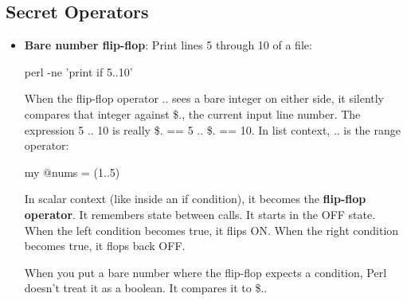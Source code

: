 \documentclass{report}
\begin{document}
    \subsection{Secret Operators}
    \begin{itemize}
        \item \textbf{Bare number flip-flop}: Print lines 5 through 10 of a file:
            \bigbreak \noindent 
            \begin{perlcode}
            perl -ne 'print if 5..10'
            \end{perlcode}
            \bigbreak \noindent 
            When the flip-flop operator .. sees a bare integer on either side, it silently compares that integer against \$., the current input line number. The expression 5 .. 10 is really \$. == 5 .. \$. == 10.
            \bigbreak \noindent 
            In list context, .. is the range operator:
            \bigbreak \noindent 
            \begin{perlcode}
            my @nums = (1..5)
            \end{perlcode}
            \bigbreak \noindent 
            In scalar context (like inside an if condition), it becomes the \textbf{flip-flop operator}. It remembers state between calls. It starts in the OFF state. When the left condition becomes true, it flips ON. When the right condition becomes true, it flops back OFF.
            \bigbreak \noindent 
            \bigbreak \noindent 
            When you put a bare number where the flip-flop expects a condition, Perl doesn't treat it as a boolean. It compares it to \$..


\end{itemize}
\end{document}
